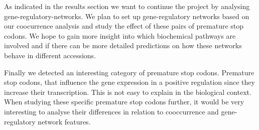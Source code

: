 As indicated in the results section we want to continue the project by analysing gene-regulatory-networks. We plan to set up gene-regulatory networks based on our coocurrence analysis and study the effect of these pairs of premature stop codons. We hope to gain more insight into which biochemical pathways are involved and if there can be more detailed predictions on how these networks behave in different accessions. 

Finally we detected an interesting category of premature stop codons. Premature stop codons, that influence the gene expression in a positive regulation since they increase their transcription. This is not easy to explain in the biological context. When studying these specific premature stop codons further, it would be very interesting to analyse their differences in relation to cooccurrence and gene-regulatory network features. 
